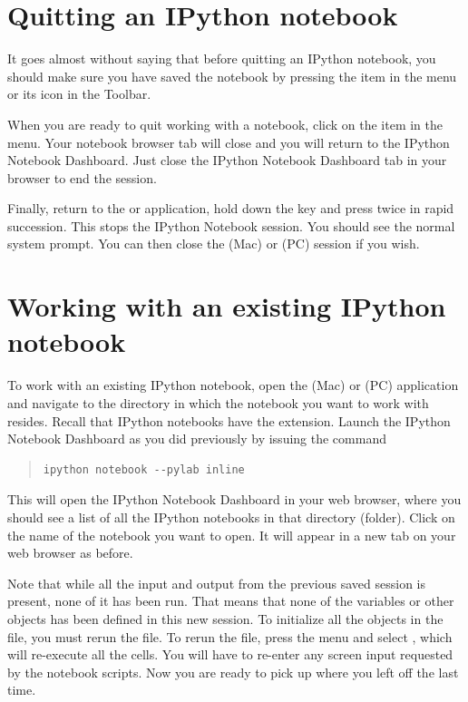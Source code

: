 \documentclass[letterpaper,10pt,english]{sphinxmanual}
\begin{document}
\section{Quitting an IPython notebook}
\label{apdx2/apdx2_ipynb:quitting-an-ipython-notebook}
It goes almost without saying that before quitting an IPython notebook, you should make sure you have saved the notebook by pressing the  item in the  menu or its icon in the Toolbar.

When you are ready to quit working with a notebook, click on the  item in the  menu.  Your notebook browser tab will close and you will return to the IPython Notebook Dashboard.  Just close the IPython Notebook Dashboard tab in your browser to end the session.

Finally, return to the  or  application, hold down the  key and press  twice in rapid succession.  This stops the IPython Notebook session.  You should see the normal system prompt.  You can then close the  (Mac) or  (PC) session if you wish.


\section{Working with an existing IPython notebook}
\label{apdx2/apdx2_ipynb:working-with-an-existing-ipython-notebook}
To work with an existing IPython notebook, open the  (Mac) or  (PC) application and navigate to the directory in which the notebook you want to work with resides.  Recall that IPython notebooks have the  extension.  Launch the IPython Notebook Dashboard as you did previously by issuing the command
\begin{quote}

\begin{Verbatim}[commandchars=\\\{\}]
ipython notebook --pylab inline
\end{Verbatim}
\end{quote}

This will open the IPython Notebook Dashboard in your web browser, where you should see a list of all the IPython notebooks in that directory (folder).  Click on the name of the notebook you want to open.  It will appear in a new tab on your web browser as before.

Note that while all the input and output from the previous saved session is present, none of it has been run.  That means that none of the variables or other objects has been defined in this new session.  To initialize all the objects in the file, you must rerun the file.  To rerun the file, press the  menu and select , which will re-execute all the cells.  You will have to re-enter any screen input requested by the notebook scripts.  Now you are ready to pick up where you left off the last time.
\label{apdx3/apdx3_resources::doc}
\end{document}
